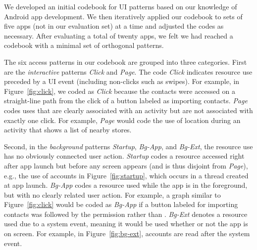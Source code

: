 
We developed an initial codebook for UI patterns based on our
knowledge of Android app development. We then iteratively applied our
codebook to sets of five apps (not in our evaluation set) at a time
and adjusted the codes as necessary. After evaluating a total of
twenty apps, we felt we had reached a codebook with a minimal set of
orthogonal patterns.


The six access patterns in our codebook are grouped into three categories.  First 
are the \emph{interactive} patterns \textit{Click} and
\textit{Page}. The code \textit{Click} indicates
resource use preceded by a UI event %
 (including non-clicks such 
as swipes). For example, in Figure~\ref{fig:click}, we coded
 as \textit{Click} because the contacts were
accessed on a straight-line path from the click of a button labeled as importing
contacts.
 \textit{Page} codes uses that are clearly associated with an activity
 but are not associated with exactly one
click.  For example, \emph{Page} would code the use of
  location during an activity that shows a
list of nearby stores.

Second, in the \emph{background} patterns \emph{Startup},
\emph{Bg-App}, and \emph{Bg-Ext}, the resource use has no obviously
connected user action. %
 \emph{Startup} codes a resource accessed
 right after app launch but before any screen appears
 (and is thus disjoint from \emph{Page}), e.g., the use of accounts in
Figure~\ref{fig:startup}, which occurs in a thread created at app
launch. \emph{Bg-App} codes a resource used while the app is
in the foreground, but with no clearly related user action.
 For example, a graph similar to Figure~\ref{fig:click} would be 
 coded as \emph{Bg-App} if a button labeled for importing contacts 
 was followed by the  permission 
 rather than .
 \emph{Bg-Ext} denotes a
resource used due to a system event, meaning it would be used 
whether or not the app is on screen. For example, in Figure~\ref{fig:bg-ext},
accounts are read after the  system event.

